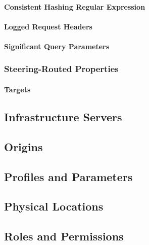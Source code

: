 \paragraph{Consistent Hashing Regular Expression}

\paragraph{Logged Request Headers}

\paragraph{Significant Query Parameters}

\subsubsection{Steering-Routed Properties}

\paragraph{Targets}



\subsection{Infrastructure Servers}



\subsection{Origins}



\subsection{Profiles and Parameters}



\subsection{Physical Locations}



\subsection{Roles and Permissions\label{sec:roles-and-perms}}



